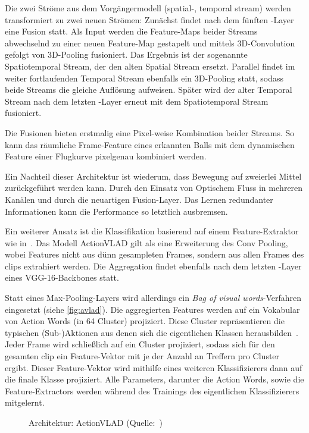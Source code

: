 Die zwei Ströme aus dem Vorgängermodell (spatial-, temporal stream) werden transformiert zu zwei neuen Strömen:
Zunächst findet nach dem fünften \conv-Layer eine Fusion statt.
Als Input werden die Feature-Maps beider Streams abwechselnd zu einer neuen Feature-Map gestapelt und mittels 3D-Convolution gefolgt von 3D-Pooling fusioniert.
Das Ergebnis ist der sogenannte Spatiotemporal Stream, der den alten Spatial Stream ersetzt.
Parallel findet im weiter fortlaufenden Temporal Stream ebenfalls ein 3D-Pooling statt, sodass beide Streams die gleiche Auflösung aufweisen.
Später wird der alter Temporal Stream nach dem letzten \fc-Layer erneut mit dem Spatiotemporal Stream fusioniert.

Die Fusionen bieten erstmalig eine Pixel-weise Kombination beider Streams.
So kann \zB das räumliche Frame-Feature eines erkannten Balls mit dem dynamischen Feature einer Flugkurve pixelgenau kombiniert werden.

Ein Nachteil dieser Architektur ist wiederum, dass Bewegung auf zweierlei Mittel zurückgeführt werden kann.
Durch den Einsatz von Optischem Fluss in mehreren Kanälen und durch die neuartigen Fusion-Layer.
Das Lernen redundanter Informationen kann die Performance so letztlich ausbremsen.

Ein weiterer Ansatz ist die Klassifikation basierend auf einem Feature-Extraktor wie in~\cite{Girdhar17}.
Das Modell ActionVLAD gilt als eine Erweiterung des Conv Pooling, wobei Features nicht aus dünn gesampleten Frames, sondern aus allen Frames des \glspl{clip} extrahiert werden.
Die Aggregation findet ebenfalls nach dem letzten \conv-Layer eines VGG-16-Backbones statt.

Statt eines Max-Pooling-Layers wird allerdings ein \emph{Bag of visual words}-Verfahren eingesetzt (siehe \autoref{fig:avlad}).
Die aggregierten Features werden auf ein Vokabular von Action Words (in 64 Cluster) projiziert.
Diese Cluster repräsentieren die typischen (Sub-)Aktionen aus denen sich die eigentlichen Klassen herausbilden~\cite{Ghosh18}.
Jeder Frame wird schließlich auf ein Cluster projiziert, sodass sich für den gesamten \gls{clip} ein Feature-Vektor mit je der Anzahl an Treffern pro Cluster ergibt.
Dieser Feature-Vektor wird mithilfe eines weiteren Klassifizierers dann auf die finale Klasse projiziert.
Alle Parameters, darunter die Action Words, sowie die Feature-Extractors werden während des Trainings des eigentlichen Klassifizierers mitgelernt.

\begin{figure}[h!]
    \centering
    \caption{Architektur: ActionVLAD (Quelle:~\cite{Girdhar17})}
    \label{fig:avlad}
\end{figure}

